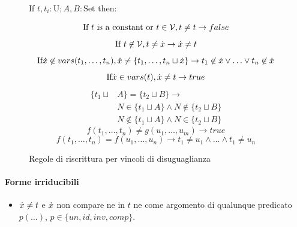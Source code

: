 \documentclass[12pt,a4paper,openright]{book} %
\begin{document}
\begin{figure}
	\begin{tcolorbox}[colframe=black, colback=white, sharp corners]
		\setcounter{equation}{0}
		\renewcommand{\theequation}{$\neq$\textsubscript{\arabic{equation}}}

		If $t, t_i: \text{U}; A,B: \text{Set}$ then:

		\begin{equation}
		\text{If } t \text{ is a constant or } t \in \mathcal{V}, t \neq t \to false
		\end{equation}
		\begin{equation}
		\text{If } t \not\in \mathcal{V}, t \neq \dot{x} \to \dot{x} \neq t
		\end{equation}
		\begin{equation}
		\text{If} \dot{x} \not\in vars(t_1, \ldots, t_n), \dot{x} \neq \{ t_1, \ldots, t_n \sqcup \dot{x} \} \to t_1 \not\in \dot{x} \lor \ldots \lor t_n \not\in \dot{x}
		\end{equation}
		\begin{equation}
		\text{If} \dot{x} \in vars(t), \dot{x} \neq t \to true
		\end{equation}
		\begin{equation}
		\begin{split}
		\{ t_1 \sqcup & A \} = \{ t_2 \sqcup B \} \to \\
		& N \in \{ t_1 \sqcup A \} \land N \not\in \{ t_2 \sqcup B \} \\
		& N \not\in \{ t_1 \sqcup A \} \land N \in \{ t_2 \sqcup B \}
		\end{split}
		\end{equation}
		\begin{equation}
		f(t_1, \ldots, t_n) \neq g(u_1, \ldots, u_m) \to true
		\end{equation}
		\begin{equation}
		f(t_1, \ldots, t_n) = f(u_1, \ldots, u_n) \to t_1 \neq u_1 \land \ldots \land t_1 \neq u_n
		\end{equation}

	\end{tcolorbox}

	\caption{Regole di riscrittura per vincoli di disuguaglianza}
	\label{fig:neq_constraints}
\end{figure}

\paragraph{Forme irriducibili}
\begin{itemize}
	\item $\dot{x} \neq t$ e $\dot{x}$ non compare ne in $t$ ne come
          argomento di qualunque predicato $p(\ldots)$, $p \in \{ un,
          id, inv, comp \}$.
\end{itemize}
\end{document}
